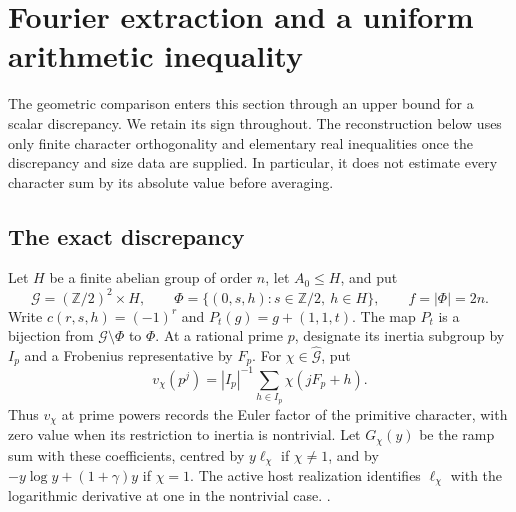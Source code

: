 \section{Fourier extraction and a uniform arithmetic inequality}\label{ar:section}

The geometric comparison enters this section through an upper bound for a scalar discrepancy. We retain its sign throughout. The reconstruction below uses only finite character orthogonality and elementary real inequalities once the discrepancy and size data are supplied. In particular, it does not estimate every character sum by its absolute value before averaging.

\subsection{The exact discrepancy}

Let \(H\) be a finite abelian group of order \(n\), let \(A_0\le H\), and put
\[
 \mathcal G=(\mathbb Z/2)^2\times H,\qquad
 \Phi=\{(0,s,h):s\in\mathbb Z/2,\ h\in H\},\qquad f=|\Phi|=2n .
\]
Write \(c(r,s,h)=(-1)^r\) and \(P_t(g)=g+(1,1,t)\). The map \(P_t\) is a bijection from \(\mathcal G\setminus\Phi\) to \(\Phi\). At a rational prime \(p\), designate its inertia subgroup by \(I_p\) and a Frobenius representative by \(F_p\). For \(\chi\in\widehat{\mathcal G}\), put
\[
 v_\chi(p^j)=|I_p|^{-1}\sum_{h\in I_p}\chi(jF_p+h).
\]
Thus \(v_\chi\) at prime powers records the Euler factor of the primitive character, with zero value when its restriction to inertia is nontrivial. Let \(G_\chi(y)\) be the ramp sum with these coefficients, centred by \(y\ell_\chi\) if \(\chi\ne1\), and by \(-y\log y+(1+\gamma)y\) if \(\chi=1\). The active host realization identifies \(\ell_\chi\) with the logarithmic derivative at one in the nontrivial case. \quad
{}.

